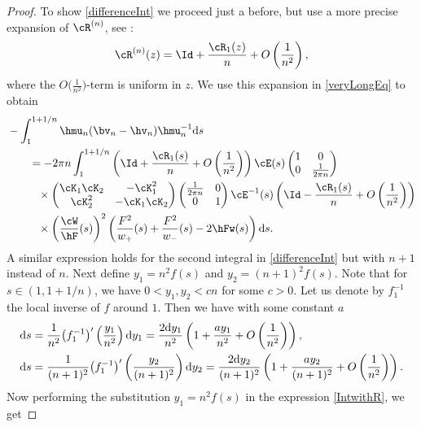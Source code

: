 \begin{proof}
To show \eqref{differenceInt} we proceed just a before, but use a more precise expansion of $\cR^{(n)}$, see \cite[equation~(8.7)]{KMVV}:
\begin{align*}
 \cR^{(n)}(z) = \Id + \frac{\cR_1(z)}{n} + O\left(\frac{1}{n^2}\right),
\end{align*}
where the $O\big(\frac{1}{n^2}\big)$-term is uniform in $z$.
We use this expansion in \eqref{veryLongEq} to obtain
\begin{align}
 &-\int_1^{1+1/n} \hmu_n(\bv_n-\hv_n)\hmu_n^{-1} {\rm d}s\nonumber
 \\
 &\qquad= -2\pi n \int_1^{1+1/n} \left( \Id + \frac{\cR_1(s)}{n}+ O\left( \frac{1}{n^2} \right)\right)\cE(s)
 \begin{pmatrix}
 1 & 0
 \\
 0 & \frac{1}{2\pi n}
 \end{pmatrix}\nonumber
 \\
 &\phantom{\qquad= }{}\times \begin{pmatrix}
 \cK_1\cK_2 & -\cK^2_1
 \\
 \cK^2_2 & -\cK_1\cK_2
 \end{pmatrix}
 \begin{pmatrix}
 \frac{1}{2\pi n} & 0
 \\
 0 & 1
 \end{pmatrix}\cE^{-1}(s)\left( \Id - \frac{\cR_1(s)}{n}+ O\left( \frac{1}{n^2} \right)\right)\nonumber
 \\
 &\phantom{\qquad= }{}\times \left(\frac{\cW}{\hF}(s)\right)^2\left(\frac{F^2}{w_+}(s)+\frac{F^2}{w_-}(s)-2\hFw(s)\right) {\rm d}s.\label{IntwithR}
\end{align}
A similar expression holds for the second integral in \eqref{differenceInt} but with $n+1$ instead of $n$. Next define $y_1 = n^2f(s)$ and $y_2 = (n+1)^2f(s)$. Note that for $s \in (1,1+1/n)$, we have $0<y_1, y_2 < cn$ for some $c > 0$. Let us denote by $f_1^{-1}$ the local inverse of $f$ around $1$. Then we have with some constant $a$
\begin{align*}
 {\rm d}s &= \frac{1}{n^2}\big(f_1^{-1}\big)'\left(\frac{y_1}{n^2}\right) {\rm d}y_1 = \frac{2{\rm d}y_1}{n^2}\left(1 + \frac{ay_1}{n^2} + O\left(\frac{1}{n^2}\right)\right),
 \\
 {\rm d}s &= \frac{1}{(n+1)^2}\big(f_1^{-1}\big)'\left(\frac{y_2}{(n+1)^2}\right) {\rm d}y_2 = \frac{2{\rm d}y_2}{(n+1)^2}\left(1 + \frac{ay_2}{(n+1)^2} + O\left(\frac{1}{n^2}\right)\right).
\end{align*}
Now performing the substitution $y_1 = n^2f(s)$ in the expression \eqref{IntwithR}, we get

\end{proof}
